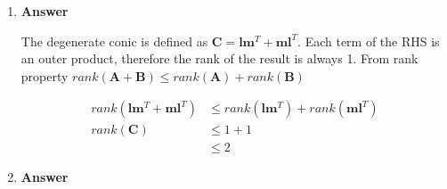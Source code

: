 \documentclass[11pt]{article}
\begin{document}
\begin{enumerate}
\item 
\noindent\textbf{Answer}

The degenerate conic is defined as $\mathbf{C} = \mathbf{l}\mathbf{m}^T + \mathbf{m}\mathbf{l}^T$. Each term of the RHS is an outer product, therefore the rank of the result is always 1. From rank property $rank(\mathbf{A}+\mathbf{B}) \leq rank(\mathbf{A})+rank(\mathbf{B})$

\begin{align*}
rank(\mathbf{l}\mathbf{m}^T+\mathbf{m}\mathbf{l}^T) &\leq rank(\mathbf{l}\mathbf{m}^T)+rank(\mathbf{m}\mathbf{l}^T) \\
rank(\mathbf{C}) &\leq 1 + 1 \\
&\leq 2
\end{align*}

\newpage
\item 
\noindent\textbf{Answer}


\end{enumerate}
\end{document}
